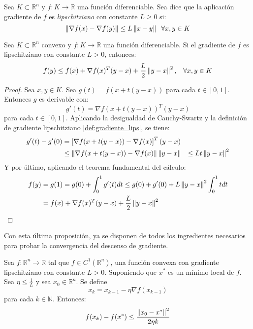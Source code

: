 \begin{definition}\label{def:gradiente_lips}
    Sea $K \subset \mathbb{R}^n$ y $f: K \rightarrow \mathbb{R}$ una función diferenciable. Sea dice que la aplicación gradiente de $f$ es \textit{lipschitziano} con constante $L\geq 0$ si:
    \[
        \left\lVert\nabla f(x) - \nabla f(y)\right\rVert \leq L \left\lVert x-y\right\rVert \;\; \forall x,y \in K
    \]
\end{definition}

\begin{proposition}
    Sea $K\subset \mathbb{R}^n$ convexo y $f: K \longrightarrow \mathbb{R}$ una función diferenciable. Si el gradiente de $f$ es lipschitziano con constante $L>0$, entonces:
    \begin{equation}\label{prop:ineq}
        f(y) \leq f(x) + \nabla f(x)^T(y-x) + \frac{L}{2}\left\lVert y-x\right\rVert^2, \;\;\; \forall x,y \in K
    \end{equation}
\end{proposition}

\begin{proof}
    Sea $x,y\in K$. Sea $g(t)=f(x+t(y-x))$ para cada $t\in[0,1]$. Entonces $g$ es derivable con:
    \[
        g'(t) = \nabla f(x+t(y-x))^T(y-x)
    \]
    para cada $t\in [0,1]$. Aplicando la desigualdad de Cauchy-Swartz y la definición de gradiente lipschitziano \ref{def:gradiente_lips}, se tiene:
    \begin{align*}
        g'(t) - g'(0) & = \left[ \nabla f(x+t(y-x))-\nabla f(x) \right]^T (y-x)\\
         & \leq \left\lVert\nabla f(x+t(y-x))-\nabla f(x)\right\rVert \left\lVert y-x\right\rVert
         & \leq Lt\left\lVert y-x\right\rVert^2
    \end{align*}
    Y por último, aplicando el teorema fundamental del cálculo:
    \begin{align*}
        f(y) & = g(1) = g(0)  + \displaystyle\int_0^1g'(t)dt \leq g(0) + g'(0) + L\left\lVert y-x\right\rVert^2\int_0^1tdt \\
             & = f(x) + \nabla f(x)^T(y-x) + \frac{L}{2}\left\lVert y-x\right\rVert^2
    \end{align*}
\end{proof}

Con esta última proposición, ya se disponen de todos los ingredientes necesarios para probar la convergencia del descenso de gradiente.

\begin{proposition}
    Sea $f: \mathbb{R}^n \longrightarrow \mathbb{R}$ tal que $f\in C^1(\mathbb{R}^n)$, una función convexa con gradiente lipschitziano con constante
    $L>0$. Suponiendo que $x^*$ es un mínimo local de $f$. Sea $\eta \leq \frac{1}{L}$ y sea $x_0\in\mathbb{R}^n$. Se define
    \[
        x_k = x_{k-1} - \eta \nabla f(x_{k-1})
    \]
    para cada $k\in\mathbb{N}$. Entonces:
    \[
        f(x_k)-f(x^*) \leq \frac{\left\lVert x_0-x^*\right\rVert^2}{2\eta k}
    \]
\end{proposition}

